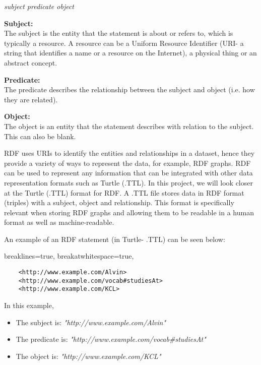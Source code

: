 \begin{center}
   \textit{subject predicate object}
\end{center} 

\textbf{Subject:} \\
The subject is the entity that the statement is about or refers to, which is typically a resource. A resource can be a Uniform Resource Identifier (URI- a string that identifies a name or a resource on the Internet), a physical thing or an abstract concept. 

\textbf{Predicate:} \\
The predicate describes the relationship between the subject and object (i.e. how they are related). 

\textbf{Object:} \\
The object is an entity that the statement describes with relation to the subject. This can also be blank. 

RDF uses URIs to identify the entities and relationships in a dataset, hence they provide a variety of ways to represent the data, for example, RDF graphs. RDF can be used to represent any information that can be integrated with other data representation formats such as Turtle (.TTL). In this project, we will look closer at the Turtle (.TTL) format for RDF. A .TTL file stores data in RDF format (triples) with a subject, object and relationship. This format is specifically relevant when storing RDF graphs and allowing them to be readable in a human format as well as machine-readable. \cite{TTL}

\medskip
An example of an RDF statement (in Turtle- .TTL) can be seen below:

\lstset
{
    breaklines=true,
    breakatwhitespace=true,
}
\begin{center}
\begin{lstlisting}
    <http://www.example.com/Alvin> 
    <http://www.example.com/vocab#studiesAt> 
    <http://www.example.com/KCL>
\end{lstlisting}
\end{center} 

\noindent In this example, 
\begin{itemize}
\item The subject is: \textit{"http://www.example.com/Alvin"}
\item The predicate is: \textit{"http://www.example.com/vocab#studiesAt"}
\item The object is: \textit{"http://www.example.com/KCL"}
\end{itemize}

